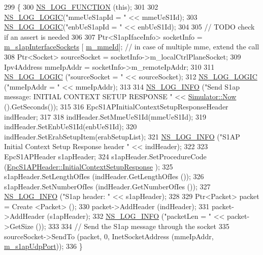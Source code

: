 \begin{DoxyCode}
299 \{
300   \hyperlink{log-macros-disabled_8h_a90b90d5bad1f39cb1b64923ea94c0761}{NS\_LOG\_FUNCTION} (\textcolor{keyword}{this});
301 
302   \hyperlink{group__logging_ga88acd260151caf2db9c0fc84997f45ce}{NS\_LOG\_LOGIC}(\textcolor{stringliteral}{"mmeUeS1apId = "} << mmeUeS1Id);
303   \hyperlink{group__logging_ga88acd260151caf2db9c0fc84997f45ce}{NS\_LOG\_LOGIC}(\textcolor{stringliteral}{"enbUeS1apId = "} << enbUeS1Id);
304 
305   \textcolor{comment}{// TODO check if an assert is needed}
306 
307   Ptr<S1apIfaceInfo> socketInfo = \hyperlink{classns3_1_1EpcS1apEnb_ad91b3139b21bd084edf401249d4e4233}{m\_s1apInterfaceSockets} [
      \hyperlink{classns3_1_1EpcS1apEnb_a44a703502c1439b86664b12751b15d69}{m\_mmeId}]; \textcolor{comment}{// in case of multiple mme, extend the call}
308   Ptr<Socket> sourceSocket = socketInfo->m\_localCtrlPlaneSocket;
309   Ipv4Address mmeIpAddr = socketInfo->m\_remoteIpAddr;
310 
311   \hyperlink{group__logging_ga88acd260151caf2db9c0fc84997f45ce}{NS\_LOG\_LOGIC} (\textcolor{stringliteral}{"sourceSocket = "} << sourceSocket);
312   \hyperlink{group__logging_ga88acd260151caf2db9c0fc84997f45ce}{NS\_LOG\_LOGIC} (\textcolor{stringliteral}{"mmeIpAddr = "} << mmeIpAddr);
313 
314   \hyperlink{group__logging_gafbd73ee2cf9f26b319f49086d8e860fb}{NS\_LOG\_INFO} (\textcolor{stringliteral}{"Send S1ap message: INITIAL CONTEXT SETUP RESPONSE "} << 
      \hyperlink{classns3_1_1Simulator_ac3178fa975b419f7875e7105be122800}{Simulator::Now} ().GetSeconds());
315 
316   EpcS1APInitialContextSetupResponseHeader indHeader;
317   
318   indHeader.SetMmeUeS1Id(mmeUeS1Id);
319   indHeader.SetEnbUeS1Id(enbUeS1Id);
320   indHeader.SetErabSetupItem(erabSetupList);
321   \hyperlink{group__logging_gafbd73ee2cf9f26b319f49086d8e860fb}{NS\_LOG\_INFO} (\textcolor{stringliteral}{"S1AP Initial Context Setup Response header "} << indHeader);
322 
323   EpcS1APHeader s1apHeader;
324   s1apHeader.SetProcedureCode (\hyperlink{classns3_1_1EpcS1APHeader_aedd7ba8568bf04ce8960bd840712a63eaa7514c43bcf4967085e33f2258d754d0}{EpcS1APHeader::InitialContextSetupResponse}
      );
325   s1apHeader.SetLengthOfIes (indHeader.GetLengthOfIes ());
326   s1apHeader.SetNumberOfIes (indHeader.GetNumberOfIes ());
327   \hyperlink{group__logging_gafbd73ee2cf9f26b319f49086d8e860fb}{NS\_LOG\_INFO} (\textcolor{stringliteral}{"S1ap header: "} << s1apHeader);
328 
329   Ptr<Packet> packet = Create <Packet> ();
330   packet->AddHeader (indHeader);
331   packet->AddHeader (s1apHeader);
332   \hyperlink{group__logging_gafbd73ee2cf9f26b319f49086d8e860fb}{NS\_LOG\_INFO} (\textcolor{stringliteral}{"packetLen = "} << packet->GetSize ());
333 
334   \textcolor{comment}{// Send the S1ap message through the socket}
335   sourceSocket->SendTo (packet, 0, InetSocketAddress (mmeIpAddr, \hyperlink{classns3_1_1EpcS1apEnb_ae06c681ae6a91dc4729408d0a7b4dd39}{m\_s1apUdpPort}));
336 \}
\end{DoxyCode}


